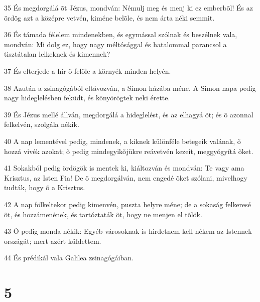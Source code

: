 \par 35 És megdorgálá õt Jézus, mondván: Némulj meg és menj ki ez emberbõl! És az ördög azt a középre vetvén, kiméne belõle, és nem árta néki semmit.
\par 36 És támada félelem mindenekben, és egymással szólnak és beszélnek vala, mondván: Mi dolg ez, hogy nagy méltósággal és hatalommal parancsol a tisztátalan lelkeknek és kimennek?
\par 37 És elterjede a hír õ felõle a környék minden helyén.
\par 38 Azután a zsinagógából eltávozván, a Simon házába méne. A Simon napa pedig nagy hideglelésben feküdt, és könyörögtek neki érette.
\par 39 És Jézus mellé állván, megdorgálá a hideglelést, és az elhagyá õt; és õ azonnal felkelvén, szolgála nékik.
\par 40 A nap lementével pedig, mindenek, a kiknek különféle betegeik valának, õ hozzá vivék azokat; õ pedig mindegyikõjükre reávetvén kezeit, meggyógyítá õket.
\par 41 Sokakból pedig ördögök is mentek ki, kiáltozván és mondván: Te vagy ama Krisztus, az Isten Fia! De õ megdorgálván, nem engedé õket szólani, mivelhogy tudták,  hogy õ a Krisztus.
\par 42 A nap fölkeltekor pedig kimenvén, puszta helyre méne; de a sokaság felkeresé õt, és hozzámenének, és tartóztaták õt, hogy ne menjen el tõlök.
\par 43 Õ pedig monda nékik: Egyéb városoknak is hirdetnem kell nékem az Istennek országát; mert azért küldettem.
\par 44 És prédikál vala Galilea zsinagógáiban.

\chapter{5}


